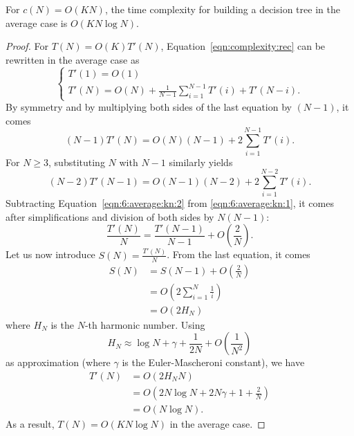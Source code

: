 \begin{theorem}\label{thm:6:average:kn}
For $c(N)=O(K N)$, the time complexity for building a decision
tree in the average case is $O(K N \log N)$.
\end{theorem}

\begin{proof}
For $T(N) = O(K)T'(N)$, Equation~\ref{eqn:complexity:rec}
can be rewritten in the average case as
\begin{equation}
\begin{cases}
T'(1) = O(1) \\
T'(N) = O(N) +  \frac{1}{N-1} \sum_{i=1}^{N-1} T'(i) + T'(N-i).
\end{cases}
\end{equation}
By symmetry and by multiplying both sides of the last equation by $(N-1)$, it comes
\begin{equation}\label{eqn:6:average:kn:1}
(N-1) T'(N) = O(N)(N-1) +  2 \sum_{i=1}^{N-1} T'(i).
\end{equation}
For $N \geq 3$, substituting $N$ with $N-1$ similarly yields
\begin{equation}\label{eqn:6:average:kn:2}
(N-2) T'(N-1) = O(N-1)(N-2) +  2 \sum_{i=1}^{N-2} T'(i).
\end{equation}
Subtracting Equation~\ref{eqn:6:average:kn:2} from \ref{eqn:6:average:kn:1},
it comes after simplifications and division of both sides by $N(N-1)$:
\begin{equation}
\frac{T'(N)}{N} = \frac{T'(N-1)}{N-1} + O(\frac{2}{N}).
\end{equation}
Let us now introduce $S(N) = \frac{T'(N)}{N}$. From the last equation, it comes
\begin{align}
S(N) &= S(N-1) + O(\frac{2}{N}) \nonumber \\
     &= O(2 \sum_{i=1}^N \frac{1}{i} ) \nonumber \\
     &= O(2 H_N)
\end{align}
where $H_N$ is the $N$-th harmonic number. Using
\begin{equation}
H_N \approx \log N + \gamma + \frac{1}{2N} + O(\frac{1}{N^2})
\end{equation}
as approximation (where $\gamma$ is the Euler-Mascheroni constant), we have
\begin{align}
T'(N) &= O(2 H_N N) \nonumber \\
&= O(2 N \log N + 2 N\gamma + 1 + \frac{2}{N}) \nonumber \\
&= O(N \log N).
\end{align}
As a result, $T(N) = O(KN \log N)$ in the average case.
\end{proof}

